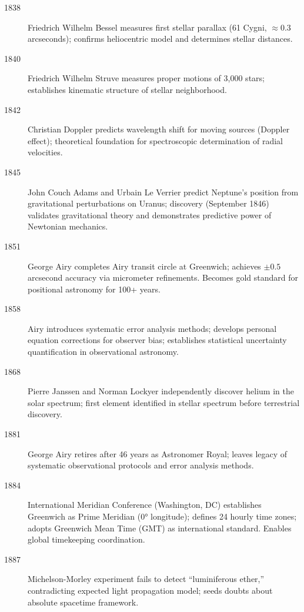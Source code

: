 \begin{description}
\item[1838] Friedrich Wilhelm Bessel measures first stellar parallax (61 Cygni, $\approx 0.3$ arcseconds); confirms heliocentric model and determines stellar distances.

\item[1840] Friedrich Wilhelm Struve measures proper motions of 3,000 stars; establishes kinematic structure of stellar neighborhood.

\item[1842] Christian Doppler predicts wavelength shift for moving sources (Doppler effect); theoretical foundation for spectroscopic determination of radial velocities.

\item[1845] John Couch Adams and Urbain Le Verrier predict Neptune's position from gravitational perturbations on Uranus; discovery (September 1846) validates gravitational theory and demonstrates predictive power of Newtonian mechanics.

\item[1851] George Airy completes Airy transit circle at Greenwich; achieves $\pm 0.5$ arcsecond accuracy via micrometer refinements. Becomes gold standard for positional astronomy for 100+ years.

\item[1858] Airy introduces systematic error analysis methods; develops personal equation corrections for observer bias; establishes statistical uncertainty quantification in observational astronomy.

\item[1868] Pierre Janssen and Norman Lockyer independently discover helium in the solar spectrum; first element identified in stellar spectrum before terrestrial discovery.

\item[1881] George Airy retires after 46 years as Astronomer Royal; leaves legacy of systematic observational protocols and error analysis methods.

\item[1884] International Meridian Conference (Washington, DC) establishes Greenwich as Prime Meridian (0° longitude); defines 24 hourly time zones; adopts Greenwich Mean Time (GMT) as international standard. Enables global timekeeping coordination.

\item[1887] Michelson-Morley experiment fails to detect ``luminiferous ether,'' contradicting expected light propagation model; seeds doubts about absolute spacetime framework.


\end{description}
